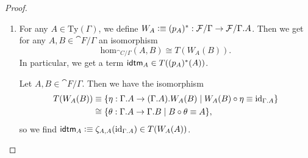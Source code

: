 \begin{proof}
\begin{enumerate}
\medskip
By \autoref{lem:cwf_to_dsys} we may define
\begin{equation*}
\zeta_{A,f}(\theta)\defeq \varphi_{f^\ast(A)}(\theta^\ast(\delta_A))
\end{equation*}
for any $\theta\in\{\theta:\Delta\to\ctxext{\Gamma}{A}\mid p_A\circ\theta\jdeq f\}$. 
Since $\zeta_{A,f}$ is a composition of isomorphism, it is itself an isomorphism.
Also, we get immediately that $\zeta_{A,\catid{\Gamma}}(\theta)\jdeq\theta$. To
show the remaining identity:
\begin{align*}
\zeta_{A,f\circ g}(\theta\circ g)
& \jdeq \varphi_{g^\ast(f^\ast(A))}((\theta\circ g)^\ast(\delta_A)) \\
& \jdeq \varphi_{g^\ast(f^\ast(A))}(g^\ast(\theta^\ast(\delta_A))) \\
& \jdeq \varphi_{g^\ast(f^\ast(A))}(g^\ast(\varphi_{f^\ast(A)}(\theta^\ast(\delta_A))^\ast(\delta_A))) \\
& \jdeq \varphi_{g^\ast(f^\ast(A))}(g^\ast(\zeta_{A,f}(\theta)^\ast(\delta_A))) \\
& \jdeq \varphi_{g^\ast(f^\ast(A))}((\zeta_{A,f}(\theta)\circ g)^\ast(\delta_A)) \\
& \jdeq \zeta_{f^\ast(A),g}(\zeta_{A,f}(\theta)\circ g).
\end{align*}
This completes the proof that the isomorphisms $\zeta_{A,f}$ satisfy the required
equalities.

\item
For any $A\in\mathrm{Ty}(\Gamma)$, we define
$W_A\defeq (p_A)^\ast:\cat{F}/\Gamma\to\cat{F}/\ctxext{\Gamma}{A}$. Then we get
for any $A,B\in\cat{F}/\Gamma$ an isomorphism
\begin{equation*}
\mathrm{hom}_{\cat{C}/\Gamma}(A,B)
  \cong
T(W_A(B)).
\end{equation*}
In particular, we get a term $\idtm{A}\in T((p_A)^\ast(A))$. 
\medskip

Let $A,B\in\cat{F}/\Gamma$. Then we have the isomorphism
\begin{align*}
T(W_A(B)) & \jdeq \{\eta:\ctxext{\Gamma}{A}\to\ctxext{{\Gamma}{A}}{W_A(B)}\mid W_A(B)\circ\eta\jdeq\catid{\ctxext{\Gamma}{A}}\} \\
  & \cong
\{\theta:\ctxext{\Gamma}{A}\to\ctxext{\Gamma}{B}\mid B\circ\theta\jdeq A\},
\end{align*}
so we find $\idtm{A}\defeq\zeta_{A,A}(\catid{\ctxext{\Gamma}{A}})\in T(W_A(A))$.


\end{enumerate}
\end{proof}
